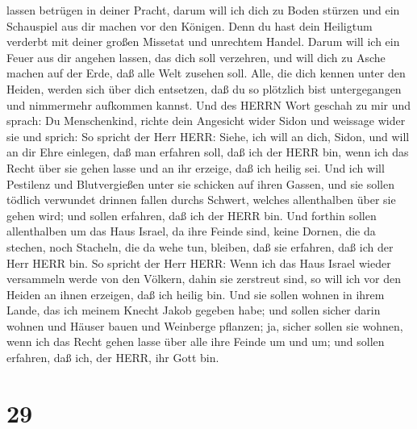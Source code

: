 lassen betrügen in deiner Pracht, darum will ich dich zu Boden stürzen
und ein Schauspiel aus dir machen vor den Königen.  Denn du
hast dein Heiligtum verderbt mit deiner großen Missetat und unrechtem
Handel. Darum will ich ein Feuer aus dir angehen lassen, das dich soll
verzehren, und will dich zu Asche machen auf der Erde, daß alle Welt
zusehen soll.  Alle, die dich kennen unter den Heiden,
werden sich über dich entsetzen, daß du so plötzlich bist untergegangen
und nimmermehr aufkommen kannst.  Und des HERRN Wort
geschah zu mir und sprach:  Du Menschenkind, richte dein
Angesicht wider Sidon und weissage wider sie  und sprich:
So spricht der Herr HERR: Siehe, ich will an dich, Sidon, und will an
dir Ehre einlegen, daß man erfahren soll, daß ich der HERR bin, wenn ich
das Recht über sie gehen lasse und an ihr erzeige, daß ich heilig sei.
 Und ich will Pestilenz und Blutvergießen unter sie
schicken auf ihren Gassen, und sie sollen tödlich verwundet drinnen
fallen durchs Schwert, welches allenthalben über sie gehen wird; und
sollen erfahren, daß ich der HERR bin.  Und forthin sollen
allenthalben um das Haus Israel, da ihre Feinde sind, keine Dornen, die
da stechen, noch Stacheln, die da wehe tun, bleiben, daß sie erfahren,
daß ich der Herr HERR bin.  So spricht der Herr HERR: Wenn
ich das Haus Israel wieder versammeln werde von den Völkern, dahin sie
zerstreut sind, so will ich vor den Heiden an ihnen erzeigen, daß ich
heilig bin. Und sie sollen wohnen in ihrem Lande, das ich meinem Knecht
Jakob gegeben habe;  und sollen sicher darin wohnen und
Häuser bauen und Weinberge pflanzen; ja, sicher sollen sie wohnen, wenn
ich das Recht gehen lasse über alle ihre Feinde um und um; und sollen
erfahren, daß ich, der HERR, ihr Gott bin.

\hypertarget{section-28}{%
\section{29}\label{section-28}}


